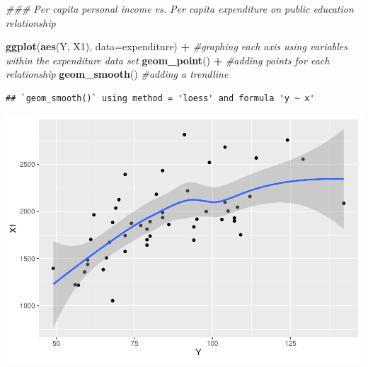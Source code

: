 \documentclass[]{article}
\newenvironment{Shaded}{\begin{snugshade}}{\end{snugshade}}
\newcommand{\CommentTok}[1]{\textcolor[rgb]{0.56,0.35,0.01}{\textit{#1}}}
\newcommand{\DataTypeTok}[1]{\textcolor[rgb]{0.13,0.29,0.53}{#1}}
\newcommand{\KeywordTok}[1]{\textcolor[rgb]{0.13,0.29,0.53}{\textbf{#1}}}
\newcommand{\NormalTok}[1]{#1}
\newcommand{\OperatorTok}[1]{\textcolor[rgb]{0.81,0.36,0.00}{\textbf{#1}}}
\newcommand{\StringTok}[1]{\textcolor[rgb]{0.31,0.60,0.02}{#1}}
\begin{document}
\begin{Shaded}
\begin{Highlighting}[]
\CommentTok{### Per capita personal income vs. Per capita expenditure on public education relationship}

\KeywordTok{ggplot}\NormalTok{(}\KeywordTok{aes}\NormalTok{(Y, X1), }\DataTypeTok{data=}\NormalTok{expenditure) }\OperatorTok{+}\StringTok{ }\CommentTok{#graphing each axis using variables within the expenditure data set}
\StringTok{  }\KeywordTok{geom_point}\NormalTok{() }\OperatorTok{+}\StringTok{ }\CommentTok{#adding points for each relationship}
\StringTok{  }\KeywordTok{geom_smooth}\NormalTok{() }\CommentTok{#adding a trendline}
\end{Highlighting}
\end{Shaded}

\begin{verbatim}
## `geom_smooth()` using method = 'loess' and formula 'y ~ x'
\end{verbatim}

\includegraphics{Problem-Set-Answers_files/figure-latex/unnamed-chunk-1-1.pdf}
\end{document}
